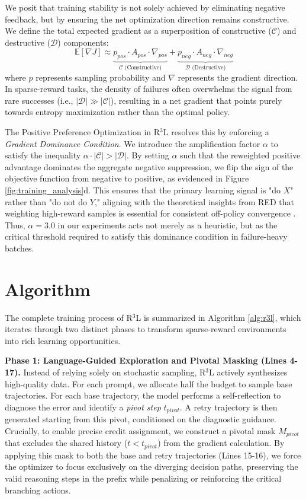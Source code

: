 \documentclass[11pt]{article}
\begin{document}
We posit that training stability is not solely achieved by eliminating negative feedback, but by ensuring the net optimization direction remains constructive. We define the total expected gradient as a superposition of constructive ($\mathcal{C}$) and destructive ($\mathcal{D}$) components:
\begin{equation}
    \mathbb{E}[\nabla J] \approx \underbrace{p_{pos} \cdot A_{pos} \cdot \nabla_{pos}}_{\mathcal{C} \text{ (Constructive)}} + \underbrace{p_{neg} \cdot A_{neg} \cdot \nabla_{neg}}_{\mathcal{D} \text{ (Destructive)}}
\end{equation}
where $p$ represents sampling probability and $\nabla$ represents the gradient direction. In sparse-reward tasks, the density of failures often overwhelms the signal from rare successes (i.e., $|\mathcal{D}| \gg |\mathcal{C}|$), resulting in a net gradient that points purely towards entropy maximization rather than the optimal policy.

The Positive Preference Optimization in R$^3$L resolves this by enforcing a \textit{Gradient Dominance Condition}. We introduce the amplification factor $\alpha$ to satisfy the inequality $\alpha \cdot |\mathcal{C}| > |\mathcal{D}|$. By setting $\alpha$ such that the reweighted positive advantage dominates the aggregate negative suppression, we flip the sign of the objective function from negative to positive, as evidenced in Figure \ref{fig:training_analysis}d. This ensures that the primary learning signal is "do $X$" rather than "do not do $Y$," aligning with the theoretical insights from RED that weighting high-reward samples is essential for consistent off-policy convergence \cite{yao2025group}. Thus, $\alpha=3.0$ in our experiments acts not merely as a heuristic, but as the critical threshold required to satisfy this dominance condition in failure-heavy batches.

\section{Algorithm}
\label{sec:algorithm}

The complete training process of R$^3$L is summarized in Algorithm \ref{alg:r3l}, which iterates through two distinct phases to transform sparse-reward environments into rich learning opportunities.

\textbf{Phase 1: Language-Guided Exploration and Pivotal Masking (Lines 4-17).}
Instead of relying solely on stochastic sampling, R$^3$L actively synthesizes high-quality data. For each prompt, we allocate half the budget to sample base trajectories. For each base trajectory, the model performs a self-reflection to diagnose the error and identify a \textit{pivot step} $t_{pivot}$. A retry trajectory is then generated starting from this pivot, conditioned on the diagnostic guidance. Crucially, to enable precise credit assignment, we construct a pivotal mask $M_{pivot}$ that excludes the shared history ($t < t_{pivot}$) from the gradient calculation. By applying this mask to both the base and retry trajectories (Lines 15-16), we force the optimizer to focus exclusively on the diverging decision paths, preserving the valid reasoning steps in the prefix while penalizing or reinforcing the critical branching actions.
\end{document}
